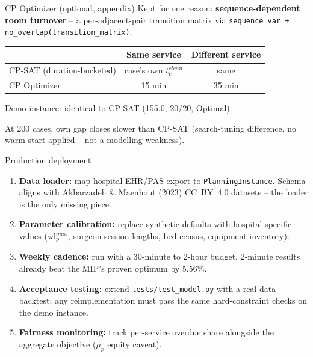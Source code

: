 \documentclass[10pt,aspectratio=169]{beamer}
\newcommand{\bk}{\hfill\hyperlink{toc}{\beamerreturnbutton{Agenda}}}
\begin{document}
\begin{frame}{CP Optimizer (optional, appendix)}
  \small Kept for one reason: \textbf{sequence-dependent room turnover}
  -- a per-adjacent-pair transition matrix via
  \texttt{sequence\_var + no\_overlap(transition\_matrix)}.
  \begin{center}\small
  \begin{tabular}{lcc}
    \toprule
    & Same service & Different service \\
    \midrule
    CP-SAT (duration-bucketed) & case's own $t_c^{clean}$ & same \\
    CP Optimizer & 15 min & 35 min \\
    \bottomrule
  \end{tabular}
  \end{center}
  Demo instance: identical to CP-SAT (155.0, 20/20, Optimal).

  At 200 cases, own gap closes slower than CP-SAT (search-tuning
  difference, no warm start applied -- not a modelling weakness).
  \bk
\end{frame}

\begin{frame}{Production deployment}
  \begin{enumerate}\small
    \item \textbf{Data loader:} map hospital EHR/PAS export to
      \texttt{PlanningInstance}. Schema aligns with Akbarzadeh \& Maenhout
      (2023) CC~BY~4.0 datasets -- the loader is the only missing piece.
    \item \textbf{Parameter calibration:} replace synthetic defaults with
      hospital-specific values ($\text{wl}^{max}_p$, surgeon session lengths,
      bed census, equipment inventory).
    \item \textbf{Weekly cadence:} run with a 30-minute to 2-hour budget.
      2-minute results already beat the MIP's proven optimum by 5.56\%.
    \item \textbf{Acceptance testing:} extend \texttt{tests/test\_model.py}
      with a real-data backtest; any reimplementation must pass the same
      hard-constraint checks on the demo instance.
    \item \textbf{Fairness monitoring:} track per-service overdue share
      alongside the aggregate objective ($\mu_p$ equity caveat).
  \end{enumerate}
  \bk
\end{frame}
\end{document}
